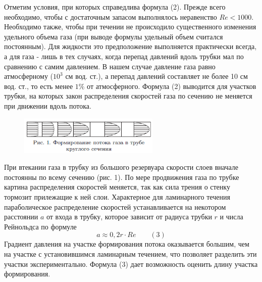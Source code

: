 \documentclass[12pt]{article}
\begin{document}
Отметим условия, при которых справедлива формула (2). Прежде всего необходимо, чтобы с достаточным запасом выполнялось неравенство $Re < 1000$. Необходимо также, чтобы при течении не происходило существенного изменения удельного объема газа (при выводе формулы удельный объем считался постоянным). Для жидкости это предположение выполняется практически всегда, а для газа - лишь в тех случаях, когда перепад давлений вдоль трубки мал по сравнению с самим давлением. В нашем случае давление газа равно атмосферному ($10^3$ см вод. ст.), а перепад давлений составляет не более 10 см вод. ст., то есть менее $1\%$ от атмосферного. Формула (2) выводится для участков трубки, на которых закон распределения скоростей газа по сечению не меняется при движении вдоль потока.
\begin{figure}[H]
  \begin{center}
    \includegraphics[width = 0.6\textwidth]{133_1.png}
  \end{center}
\end{figure}
При втекании газа в трубку из большого резервуара скорости слоев вначале постоянны по всему сечению (рис. 1). По мере продвижения газа по трубке картина распределения скоростей меняется, так как сила трения о стенку тормозит прилежащие к ней слои. Характерное для ламинарного течения параболическое распределение скоростей устанавливается на некотором расстоянии $a$ от входа в трубку, которое зависит от радиуса трубки $r$ и числа Рейнольдса по формуле
\[a \approx  0,2 r \cdot Re \text{ } \text{ } \text{ } (3)\]
Градиент давления на участке формирования потока оказывается большим, чем на участке с установившимся ламинарным течением, что позволяет разделить эти участки экспериментально. Формула (3) дает возможность оценить длину участка формирования.
\end{document}
